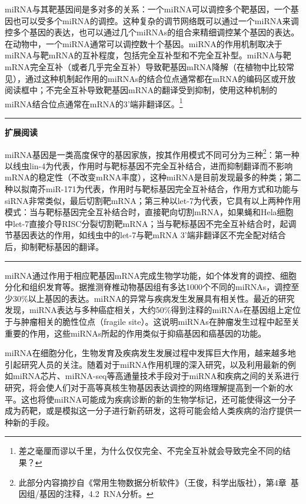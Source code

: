 \documentclass[11pt,a4paper,twoside]{book}
\begin{document}
miRNA与其靶基因间是多对多的关系：一个miRNA可以调控多个靶基因，一个基因也可以受多个miRNA的调控。这种复杂的调节网络既可以通过一个miRNA来调控多个基因的表达，也可以通过几个miRNAs的组合来精细调控某个基因的表达。在动物中，一个miRNA通常可以调控数十个基因。miRNA的作用机制取决于miRNA与靶mRNA的互补程度，包括完全互补型和不完全互补型。miRNA与靶mRNA完全互补（或者几乎完全互补）导致靶基因mRNA降解（在植物中比较常见），通过这种机制起作用的miRNAs的结合位点通常都在mRNA的编码区或开放阅读框中；不完全互补导致靶基因mRNA的翻译受到抑制，使用这种机制的miRNA结合位点通常在mRNA的3'端非翻译区。\footnote{差之毫厘而谬以千里，为什么仅仅完全、不完全互补就会导致完全不同的结果？}

\vspace{0.5cm}
\hrule height 3pt

\noindent
{\large \bfseries \HandPencilLeft 扩展阅读}

{\small
miRNA基因是一类高度保守的基因家族，按其作用模式不同可分为三种\footnote{此部分内容摘抄自《常用生物数据分析软件》（王俊，科学出版社），第4章\ 基因组/基因的注释，4.2\ RNA分析。}：第一种以线虫lin-4为代表，作用时与靶标基因不完全互补结合，进而抑制翻译而不影响mRNA的稳定性（不改变mRNA丰度），这种miRNA是目前发现最多的种类；第二种以拟南芥miR-171为代表，作用时与靶标基因完全互补结合，作用方式和功能与siRNA非常类似，最后切割靶mRNA；第三种以let-7为代表，它具有以上两种作用模式：当与靶标基因完全互补结合时，直接靶向切割mRNA，如果蝇和Hela细胞中let-7直接介导RISC分裂切割靶mRNA；当与靶标基因不完全互补结合时，起调节基因表达的作用，如线虫中的let-7与靶mRNA 3'端非翻译区不完全配对结合后，抑制靶标基因的翻译。
}

\hrule height 3pt
\vspace{0.5cm}

miRNA通过作用于相应靶基因mRNA完成生物学功能，如个体发育的调控、细胞分化和组织发育等。据推测脊椎动物基因组有多达1000个不同的miRNAs，调控至少30\%以上基因的表达。miRNA的异常与疾病发生发展具有相关性。最近的研究发现，miRNA表达与多种癌症相关，大约50\%得到注释的miRNAs在基因组上定位于与肿瘤相关的脆性位点（fragile site）。这说明miRNAs在肿瘤发生过程中起至关重要的作用，这些miRNAs所起的作用类似于抑癌基因和癌基因的功能。

miRNA在细胞分化，生物发育及疾病发生发展过程中发挥巨大作用，越来越多地引起研究人员的关注。随着对于miRNA作用机理的深入研究，以及利用最新的例如miRNA芯片、miRNA-seq等高通量技术手段对于miRNA和疾病之间的关系进行研究，将会使人们对于高等真核生物基因表达调控的网络理解提高到一个新的水平。这也将使miRNA可能成为疾病诊断的新的生物学标记，还可能使得这一分子成为药靶，或是模拟这一分子进行新药研发，这将可能会给人类疾病的治疗提供一种新的手段。
\end{document}
